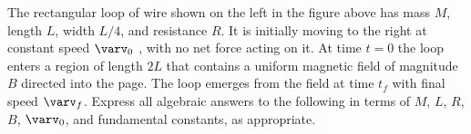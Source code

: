 \documentclass{../../oss-apphys-exam}
\begin{document}
\begin{questions}
%            
%            
%
%      
%
%
%    
%
  
  \question The rectangular loop of wire shown on the left in the figure above
  has mass $M$, length $L$, width $L/4$, and resistance $R$. It is initially
  moving to the right at constant speed $\varv_0$ , with no net force acting on
  it. At time $t=0$ the loop enters a region of length $2L$ that contains a
  uniform magnetic field of magnitude $B$ directed into the page. The loop
  emerges from the field at time $t_f$ with final speed $\varv_f$. Express all
  algebraic answers to the following in terms of $M$, $L$, $R$, $B$, $\varv_0$,
  and fundamental constants, as appropriate.
  \begin{parts}

\end{parts}
\end{questions}
\end{document}
